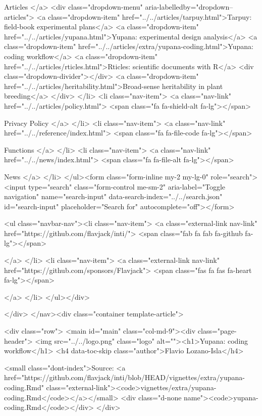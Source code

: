    Articles
  </a>
  <div class="dropdown-menu" aria-labelledby="dropdown--articles">
    <a class="dropdown-item" href="../../articles/tarpuy.html">Tarpuy: field-book experimental plans</a>
    <a class="dropdown-item" href="../../articles/yupana.html">Yupana: experimental design analysis</a>
    <a class="dropdown-item" href="../../articles/extra/yupana-coding.html">Yupana: coding workflow</a>
    <a class="dropdown-item" href="../../articles/rticles.html">Rticles: scientific documents with R</a>
    <div class="dropdown-divider"></div>
    <a class="dropdown-item" href="../../articles/heritability.html">Broad-sense heritability in plant breeding</a>
  </div>
</li>
<li class="nav-item">
  <a class="nav-link" href="../../articles/policy.html">
    <span class="fa fa-shield-alt fa-lg"></span>
     
    Privacy Policy
  </a>
</li>
<li class="nav-item">
  <a class="nav-link" href="../../reference/index.html">
    <span class="fa fa-file-code fa-lg"></span>
     
    Functions
  </a>
</li>
<li class="nav-item">
  <a class="nav-link" href="../../news/index.html">
    <span class="fa fa-file-alt fa-lg"></span>
     
    News
  </a>
</li>
      </ul><form class="form-inline my-2 my-lg-0" role="search">
        <input type="search" class="form-control me-sm-2" aria-label="Toggle navigation" name="search-input" data-search-index="../../search.json" id="search-input" placeholder="Search for" autocomplete="off"></form>

      <ul class="navbar-nav"><li class="nav-item">
  <a class="external-link nav-link" href="https://github.com/flavjack/inti/">
    <span class="fab fa fab fa-github fa-lg"></span>
     
  </a>
</li>
<li class="nav-item">
  <a class="external-link nav-link" href="https://github.com/sponsors/Flavjack">
    <span class="fas fa fas fa-heart fa-lg"></span>
     
  </a>
</li>
      </ul></div>

    
  </div>
</nav><div class="container template-article">


<div class="row">
  <main id="main" class="col-md-9"><div class="page-header">
      <img src="../../logo.png" class="logo" alt=""><h1>Yupana: coding workflow</h1>
                        <h4 data-toc-skip class="author">Flavio Lozano-Isla</h4>
            
      
      <small class="dont-index">Source: <a href="https://github.com/flavjack/inti/blob/HEAD/vignettes/extra/yupana-coding.Rmd" class="external-link"><code>vignettes/extra/yupana-coding.Rmd</code></a></small>
      <div class="d-none name"><code>yupana-coding.Rmd</code></div>
    </div>

